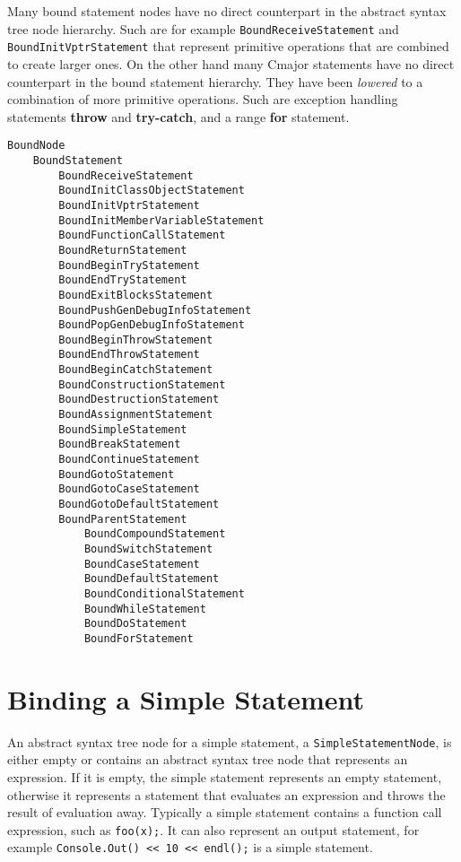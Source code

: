 \documentclass[a4paper,oneside,11pt]{book}
\theoremstyle{definition}
\begin{document}
Many bound statement nodes have no direct counterpart in the abstract syntax tree node hierarchy.
Such are for example \verb|BoundReceiveStatement| and \verb|BoundInitVptrStatement| that
represent primitive operations that are combined to create larger ones.
On the other hand many Cmajor statements have no direct counterpart in the bound statement hierarchy.
They have been \emph{lowered} to a combination of more primitive operations.
Such are exception handling statements \textbf{throw} and \textbf{try-catch}, and a range \textbf{for} statement.

\begin{verbatim}
BoundNode
    BoundStatement
        BoundReceiveStatement
        BoundInitClassObjectStatement
        BoundInitVptrStatement
        BoundInitMemberVariableStatement
        BoundFunctionCallStatement
        BoundReturnStatement
        BoundBeginTryStatement
        BoundEndTryStatement
        BoundExitBlocksStatement
        BoundPushGenDebugInfoStatement
        BoundPopGenDebugInfoStatement
        BoundBeginThrowStatement
        BoundEndThrowStatement
        BoundBeginCatchStatement
        BoundConstructionStatement
        BoundDestructionStatement
        BoundAssignmentStatement
        BoundSimpleStatement
        BoundBreakStatement
        BoundContinueStatement
        BoundGotoStatement
        BoundGotoCaseStatement
        BoundGotoDefaultStatement
        BoundParentStatement
            BoundCompoundStatement
            BoundSwitchStatement
            BoundCaseStatement
            BoundDefaultStatement
            BoundConditionalStatement
            BoundWhileStatement
            BoundDoStatement
            BoundForStatement
\end{verbatim}

\section{Binding a Simple Statement}

An abstract syntax tree node for a simple statement, a \verb|SimpleStatementNode|, is either empty or
contains an abstract syntax tree node that represents an expression.
If it is empty, the simple statement represents an empty statement,
otherwise it represents a statement that evaluates an expression and throws the result of evaluation away.
Typically a simple statement contains a function call expression, such as \verb|foo(x);|.
It can also represent an output statement, for example \verb|Console.Out() << 10 << endl();| is a simple statement.
\end{document}
